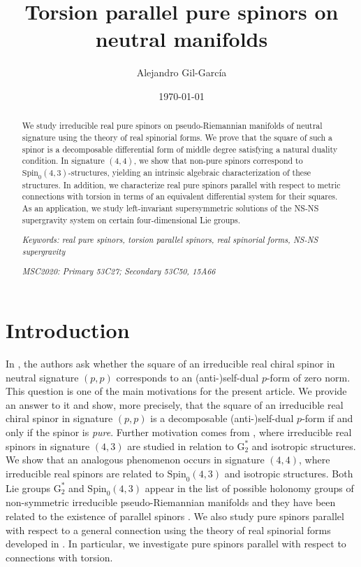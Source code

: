 \documentclass[10pt,reqno]{amsart}
\title[Torsion parallel pure spinors on neutral manifolds]{Torsion parallel pure spinors on neutral manifolds}
\author[Alejandro Gil-García]{Alejandro Gil-García \orcidlink{0000-0002-9370-241X}}
\date{\today}
\theoremstyle{definition}
\theoremstyle{remark}
\begin{document}
\begin{abstract}
We study irreducible real pure spinors on pseudo-Riemannian manifolds of neutral signature using the theory of real spinorial forms. We prove that the square of such a spinor is a decomposable differential form of middle degree satisfying a natural duality condition. In signature $(4,4)$, we show that non-pure spinors correspond to $\mathrm{Spin}_0(4,3)$-structures, yielding an intrinsic algebraic characterization of these structures. In addition, we characterize real pure spinors parallel with respect to metric connections with torsion in terms of an equivalent differential system for their squares. As an application, we study left-invariant supersymmetric solutions of the NS-NS supergravity system on certain four-dimensional Lie groups.\bigskip

\noindent
\emph{Keywords: real pure spinors, torsion parallel spinors, real spinorial forms, NS-NS supergravity}\medskip

\noindent
\emph{MSC2020: Primary 53C27; Secondary 53C50, 15A66}

\end{abstract}

\maketitle
\setcounter{tocdepth}{1}
\tableofcontents


\section{Introduction}

In \cite[Rmk.\ 3.39]{Cortes_Lazaroiu_Shahbazi2021}, the authors ask whether the square of an irreducible real chiral spinor in neutral signature $(p,p)$ corresponds to an (anti-)self-dual $p$-form of zero norm. This question is one of the main motivations for the present article. We provide an answer to it and show, more precisely, that the square of an irreducible real chiral spinor in signature $(p,p)$ is a decomposable (anti-)self-dual $p$-form if and only if the spinor is \emph{pure}. Further motivation comes from \cite{GS25_G2s}, where irreducible real spinors in signature $(4,3)$ are studied in relation to $\mathrm{G}_2^*$ and isotropic structures. We show that an analogous phenomenon occurs in signature $(4,4)$, where irreducible real spinors are related to $\mathrm{Spin}_0(4,3)$ and isotropic structures. Both Lie groups $\mathrm{G}_2^*$ and $\mathrm{Spin}_0(4,3)$ appear in the list of possible holonomy groups of non-symmetric irreducible pseudo-Riemannian manifolds \cite{Ber55,Bryant1987} and they have been related to the existence of parallel spinors \cite{Baum_Kath1999}. We also study pure spinors parallel with respect to a general connection using the theory of real spinorial forms developed in \cite{Cortes_Lazaroiu_Shahbazi2021}. In particular, we investigate pure spinors parallel with respect to connections with torsion.\medskip
\end{document}
